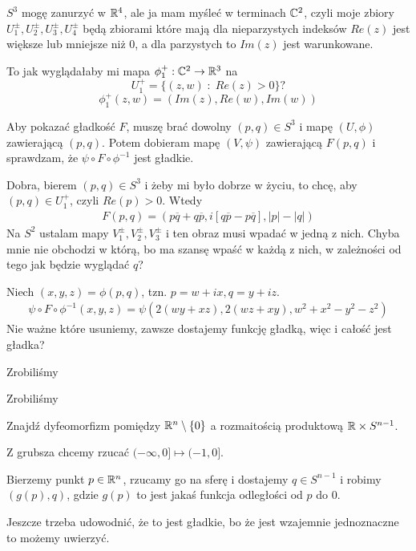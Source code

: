 \documentclass{article}
\begin{document}
$S^3$ mogę zanurzyć w $\mathbb{R}^4$, ale ja mam myśleć w terminach $\mathbb{C}^2$, czyli moje zbiory $U_1^\pm,U_2^\pm,U_3^\pm,U_4^\pm$ będą zbiorami które mają dla nieparzystych indeksów $Re(z)$ jest większe lub mniejsze niż $0$, a dla parzystych to $Im(z)$ jest warunkowane.

To jak wyglądałaby mi mapa $\phi_1^+:\mathbb{C}^2\to\mathbb{R}^3$ na
$$U_1^+=\{(z,w)\;:\;Re(z)>0\}?$$
$$\phi_1^+(z,w)=(Im(z), Re(w),Im(w))$$

Aby pokazać gładkość $F$, muszę brać dowolny $(p,q)\in S^3$ i mapę $(U,\phi)$ zawierającą $(p,q)$. Potem dobieram mapę $(V,\psi)$ zawierającą $F(p,q)$ i sprawdzam, że $\psi\circ F\circ\phi^{-1}$ jest gładkie.

Dobra, bierem $(p,q)\in S^3$ i żeby mi było dobrze w życiu, to chcę, aby $(p,q)\in U_1^+$, czyli $Re(p)>0$. Wtedy
\begin{align*}
    F(p,q)=(p\overline{q}+q\overline{p}, i[q\overline{p}-p\overline{q}], |p|-|q|)
\end{align*}
Na $S^2$ ustalam mapy $V_1^\pm,V_2^\pm,V_3^\pm$ i ten obraz musi wpadać w jedną z nich. Chyba mnie nie obchodzi w którą, bo ma szansę wpaść w każdą z nich, w zależności od tego jak będzie wyglądać $q$?


Niech $(x,y,z)=\phi(p,q)$, tzn. $p=w+ix,q=y+iz$.
\begin{align*}
    \psi\circ F\circ\phi^{-1}(x, y, z)=\psi(2(wy+xz),2(wz+xy),w^2+x^2-y^2-z^2)
\end{align*}
Nie ważne które usuniemy, zawsze dostajemy funkcję gładką, więc i całość jest gładka?

\begin{problem}[10]{}
Zrobiliśmy
\end{problem}

\begin{problem}[11]{}
Zrobiliśmy
\end{problem}

\begin{problem}[12]{}
    Znajdź dyfeomorfizm pomiędzy $\mathbb{R}^n\setminus\{0\}$ a rozmaitością produktową $\mathbb{R}\times S^{n-1}$.
\end{problem}

Z grubsza chcemy rzucać $(-\infty,0]\mapsto (-1,0]$. 

Bierzemy punkt $p\in\mathbb{R}^n$, rzucamy go na sferę i dostajemy  $q\in S^{n-1}$ i robimy $(g(p),q)$, gdzie $g(p)$ to jest jakaś funkcja odległości od $p$ do $0$.

Jeszcze trzeba udowodnić, że to jest gładkie, bo że jest wzajemnie jednoznaczne to możemy uwierzyć.
\end{document}
